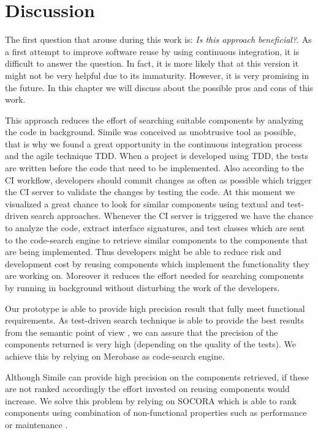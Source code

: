 \chapter{Discussion}
\label{discussion}
The first question that arouse during this work is: \emph{Is this approach beneficial?}. As a first attempt to improve software reuse by using continuous integration, it is difficult to answer the question. In fact, it is more likely that at this version it might not be very helpful due to its immaturity. However, it is very promising in the future. In this chapter we will discuss about the possible pros and cons of this work.

This approach reduces the effort of searching suitable components by analyzing the code in background. Simile was conceived as unobtrusive tool as possible, that is why we found a great opportunity in the continuous integration process and the agile technique TDD. When a project is developed using TDD, the tests are written before the code that need to be implemented. Also according to the CI workflow, developers should commit changes as often as possible which trigger the CI server to validate the changes by testing the code. At this moment we visualized a great chance to look for similar components using textual and test-driven search approaches. Whenever the CI server is triggered we have the chance to analyze the code, extract interface signatures, and test classes which are sent to the code-search engine to retrieve similar components to the components that are being implemented. Thus developers might be able to reduce risk and development cost by reusing components which implement the functionality they are working on. Moreover it reduces the effort needed for searching components by running in background without disturbing the work of the developers.

Our prototype is able to provide high precision result that fully meet functional requirements. As test-driven search technique is able to provide the best results from the semantic point of view \cite{Reiss2009,Hummel2008,Hummel2013}, we can assure that the precision of the components returned is very high (depending on the quality of the tests). We achieve this by relying on Merobase as code-search engine.

Although Simile can provide high precision on the components retrieved, if these are not ranked accordingly the effort invested on reusing components would increase. We solve this problem by relying on SOCORA which is able to rank components using combination of non-functional properties such as performance or maintenance \cite{Kessel2016}.


